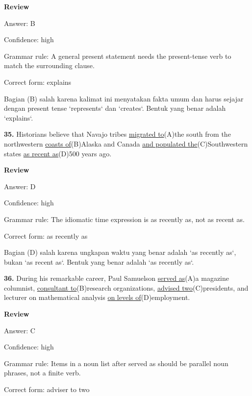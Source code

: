 \documentclass[12pt]{article}
\begin{document}
\par
\begingroup
\setlength{\parskip}{0pt}
\setlength{\parindent}{0pt}
\textbf{Review}\par
Answer: B\par
Confidence: high\par
Grammar rule: A general present statement needs the present-tense verb to match the surrounding clause.\par
Correct form: explains\par
Bagian (B) salah karena kalimat ini menyatakan fakta umum dan harus sejajar dengan present tense `represents` dan `creates`. Bentuk yang benar adalah `explains`.\par
\endgroup
\par
\vspace{\questionblockgap}
\noindent\textbf{35.} Historians believe that Navajo tribes \uline{migrated to}(A)the south from the northwestern \uline{coasts of}(B)Alaska and Canada \uline{and populated the}(C)Southwestern states \uline{as recent as}(D)500 years ago.
\par
\begingroup
\setlength{\parskip}{0pt}
\setlength{\parindent}{0pt}
\textbf{Review}\par
Answer: D\par
Confidence: high\par
Grammar rule: The idiomatic time expression is as recently as, not as recent as.\par
Correct form: as recently as\par
Bagian (D) salah karena ungkapan waktu yang benar adalah `as recently as`, bukan `as recent as`. Bentuk yang benar adalah `as recently as`.\par
\endgroup
\par
\vspace{\questionblockgap}
\noindent\textbf{36.} During his remarkable career, Paul Samuelson \uline{served as}(A)a magazine columnist, \uline{consultant to}(B)research organizations, \uline{advised two}(C)presidents, and lecturer on mathematical analysis \uline{on levels of}(D)employment.
\par
\begingroup
\setlength{\parskip}{0pt}
\setlength{\parindent}{0pt}
\textbf{Review}\par
Answer: C\par
Confidence: high\par
Grammar rule: Items in a noun list after served as should be parallel noun phrases, not a finite verb.\par
Correct form: adviser to two\par
\end{document}
